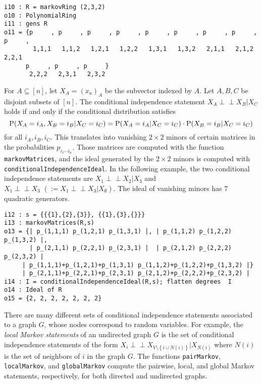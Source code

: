 \documentclass[letterpaper]{article}
\theoremstyle{definition}
\def\ci{\perp\!\!\!\perp}
\begin{document}
\begin{verbatim}
i10 : R = markovRing (2,3,2)
o10 : PolynomialRing
i11 : gens R
o11 = {p     , p     , p     , p     , p     , p     , p     , p     , p     ,
        1,1,1   1,1,2   1,2,1   1,2,2   1,3,1   1,3,2   2,1,1   2,1,2   2,2,1 
      p     , p     , p     }
       2,2,2   2,3,1   2,3,2
\end{verbatim}

For $A \subseteq [n]$, let $X_{A} = (x_{a})_{A}$ be the subvector
indexed by $A$.  Let $A,B,C$ be disjoint subsets of $[n]$.  
The conditional independence statement
$X_{A} \ci X_{B} | X_{C}$ holds if and only if the conditional
distribution satisfies
$$
{\rm P}(X_{A} = i_{A}, X_{B} = i_{B} | X_{C} = i_{C}) =
{\rm P}(X_{A} = i_{A} | X_{C} = i_{C})\cdot {\rm P}( X_{B} = i_{B} | X_{C} = i_{C})$$
for all $i_{A}, i_{B}, i_{C}$.   This translates into vanishing
$2\!\times\! 2$ minors of certain matrices in the probabilities 
$p_{i_{1}\cdots i_{n}}$.  Those matrices are computed with the 
function {\tt markovMatrices},
and the ideal generated by the $2 \!\times\! 2$ minors is computed with 
{\tt conditionalIndependenceIdeal}.  In the following example,
the two conditional independence statements are $X_{1} \ci X_{2} | X_{3}$
and $X_{1} \ci X_{3} \, \,  (:=  X_{1} \ci X_{3} | X_{\emptyset})$. 
The ideal of vanishing minors has $7$ quadratic generators. 

\begin{verbatim}
i12 : s = {{{1},{2},{3}}, {{1},{3},{}}}
i13 : markovMatrices(R,s)
o13 = {| p_(1,1,1) p_(1,2,1) p_(1,3,1) |, | p_(1,1,2) p_(1,2,2) p_(1,3,2) |, 
       | p_(2,1,1) p_(2,2,1) p_(2,3,1) |  | p_(2,1,2) p_(2,2,2) p_(2,3,2) |  
     | p_(1,1,1)+p_(1,2,1)+p_(1,3,1) p_(1,1,2)+p_(1,2,2)+p_(1,3,2) |}
     | p_(2,1,1)+p_(2,2,1)+p_(2,3,1) p_(2,1,2)+p_(2,2,2)+p_(2,3,2) |
i14 : I = conditionalIndependenceIdeal(R,s); flatten degrees  I 
o14 : Ideal of R
o15 = {2, 2, 2, 2, 2, 2, 2}
\end{verbatim}

There are many different sets of conditional independence statements
associated to a graph $G$, whose nodes correspond to random variables.
For example, the \emph{local Markov statements} of an undirected graph $G$
is the set of conditional independence statements of the form
$X_{i} \ci X_{V \setminus \left\{i \cup N(i)\right\}} | X_{N(i)}$ where $N(i)$ is the set of neighbors of $i$ in the graph $G$.
The functions {\tt pairMarkov}, {\tt localMarkov}, and {\tt globalMarkov}
compute the pairwise, local, and global Markov statements, respectively, 
for both directed and undirected graphs.
\end{document}
